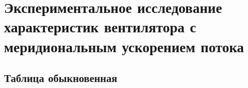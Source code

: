 \chapter{Экспериментальное исследование характеристик вентилятора с меридиональным ускорением потока}\label{ch:ch3}

\section{Таблица обыкновенная}\label{sec:ch3/sect1}

